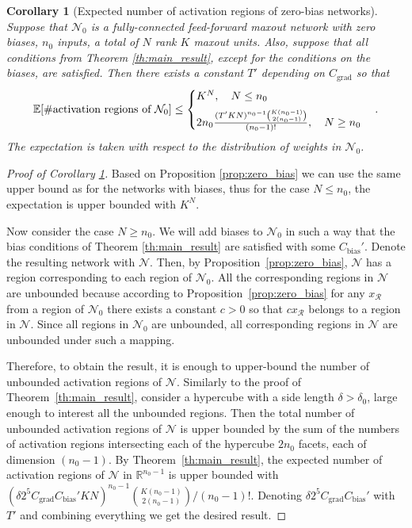 \documentclass{article}
\newtheorem{corollary}[theorem]{Corollary}
\theoremstyle{definition}
\newcommand{\net}{\mathcal{N}}
\newcommand{\nin}{n_0}
\begin{document}
\begin{corollary}[Expected number of activation regions of zero-bias networks]
    \label{cor:zero_bias_upper}
    Suppose that $\net_0$ is a fully-connected feed-forward maxout network with zero biases, $\nin$ inputs, a total of $N$ rank $K$ maxout units. Also, suppose that all conditions from Theorem \ref{th:main_result}, except for the conditions on the biases, are satisfied.
    Then there exists a constant $T'$ depending on $C_{\text{grad}}$
    so that
    \begin{align*}
        \mathbb{E}[\# \text{\normalfont activation regions of } \mathcal{N}_0 ] \leq
        \begin{cases}
            K^N, \quad N \leq \nin
            \\[5pt]
            2 \nin \frac{(T' K N)^{\nin - 1} \binom{K (\nin - 1)}{2 (\nin - 1)}}{(\nin - 1)!}, \quad N \geq \nin
        \end{cases}.
    \end{align*}
    The expectation is taken with respect to the distribution of weights in $\net_0$.
\end{corollary}
\begin{proof}[Proof of Corollary \ref{cor:zero_bias_upper}]
    Based on Proposition \ref{prop:zero_bias} we can use the same upper bound as for the networks with biases, thus for the case $N \leq \nin$, the expectation is upper bounded with $K^N$.
    
    Now consider the case $N \geq \nin$.
    We will add biases to $\net_0$ in such a way that the bias conditions of Theorem \ref{th:main_result} are satisfied with some $C_{\text{bias}}'$. Denote the resulting network with $\net$.
    Then, by Proposition~\ref{prop:zero_bias}, $\net$ has a region corresponding to each region of $\net_0$.
    All the corresponding regions in $\net$ are unbounded because according to Proposition~\ref{prop:zero_bias} for any $x_{\mathcal{R}}$ from a region of $\net_0$ there exists a constant $c > 0$ so that $c x_{\mathcal{R}}$ belongs to a region in $\net$. Since all regions in $\net_0$ are unbounded, all corresponding regions in $\net$ are unbounded under such a mapping.
    
    Therefore, to obtain the result, it is enough to upper-bound the number of unbounded activation regions of $\net$. 
    Similarly to the proof of Theorem~\ref{th:main_result}, consider a hypercube with a side length $\delta>\delta_0$, large enough to interest all the unbounded regions. Then the total number of unbounded activation regions of $\net$ is upper bounded by the sum of the numbers of activation regions intersecting each of the hypercube $2 \nin$ facets, each of dimension $(\nin - 1)$.
    By Theorem~\ref{th:main_result}, the expected number of activation regions of $\net$ in $\mathbb{R}^{\nin - 1}$ is upper bounded with ${(\delta 2^5 C_{\text{grad}} C_{\text{bias}}' K N)^{\nin - 1} \binom{K (\nin - 1)}{2 (\nin - 1)}} / {(\nin - 1)!}$. Denoting $\delta 2 ^5 C_{\text{grad}} C_{\text{bias}}'$ with $T'$ and combining everything we get the desired result.
\end{proof}
\end{document}
